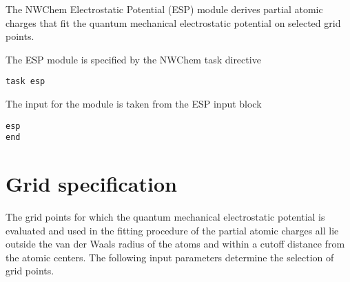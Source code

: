 \label{sec:esp}

The NWChem Electrostatic Potential (ESP) module derives partial atomic 
charges that fit the quantum mechanical electrostatic potential on selected
grid points.

The ESP module is specified by the NWChem task directive
\begin{verbatim}
task esp
\end{verbatim}

The input for the module is taken from the ESP input block
\begin{verbatim}
esp
end
\end{verbatim}

\section{Grid specification}
The grid points for which the quantum mechanical electrostatic potential is 
evaluated and used in the fitting procedure of the partial atomic charges
all lie outside the van der Waals radius of the atoms and within a cutoff
distance from the atomic centers. The following input parameters determine
the selection of grid points.

